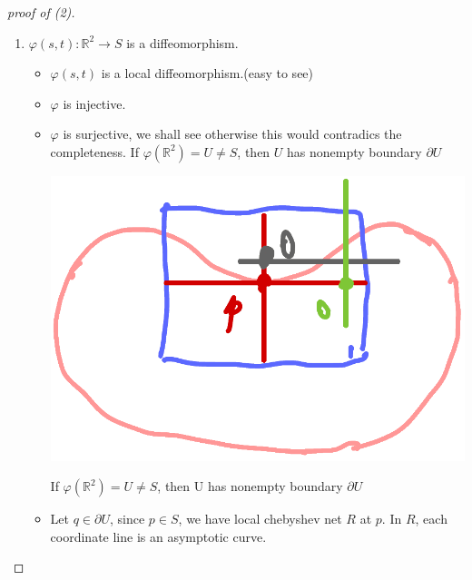 \begin{proof}[proof of (2)]
\begin{enumerate}[(1)]
    Second, let \(\varphi(s_1,t_1)\in S\) be arbitrary point,
    \(\varphi(s_1,t),0\le t\le t_1\) is a compact segment, we can
    cover it by finitely many rectangular neighborhoods and each of
    them is a chebyshev net. Since \(\varphi(s,0)\) is an asymptotic
    curve we can iterate the previous step to see \(\varphi(s,t)\)
    is an asymptotic curve.)
    \item \(\varphi(s,t)\colon \mathbb{R}^2\to S\) is a diffeomorphism.
    \begin{itemize}
        \item \(\varphi(s,t)\) is a local diffeomorphism.(easy to see)
        \item \(\varphi\) is injective.
        \item \(\varphi\) is surjective, we shall see otherwise this would
        contradics the completeness. 
        If \(\varphi(\mathbb{R}^2)=U\neq S\), then \(U\) has nonempty
        boundary \(\partial U\)
        \begin{center}
            \includegraphics[scale=.4]{picture/week15/surjectiveness.png}
        \end{center}
        If \(\varphi(\mathbb{R}^2)=U\neq S\), then U
        has nonempty boundary \(\partial U\)
        \item Let \(q\in \partial U\), since \(p\in S\), we have local 
        chebyshev net \(R\) at \(p\). In \(R\), each coordinate line 
        is an asymptotic curve.
        

\end{itemize}
\end{enumerate}
\end{proof}
